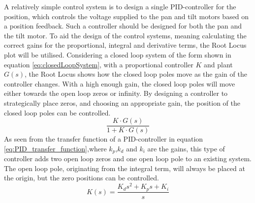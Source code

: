 \documentclass[../../main.tex]{subfiles}
\begin{document}
A relatively simple control system is to design a single PID-controller for the position, which controls the voltage supplied to the pan and tilt motors based on a position feedback. Such a controller should be designed for both the pan and the tilt motor. To aid the design of the control systems, meaning calculating the correct gains for the proportional, integral and derivative terms, the Root Locus plot will be utilised. Considering a closed loop system of the form shown in equation \ref{eq:closedLoopSystem}, with a proportional controller $K$ and plant $G(s)$, the Root Locus shows how the closed loop poles move as the gain of the controller changes. With a high enough gain, the closed loop poles will move either towards the open loop zeros or infinity. By designing a controller to strategically place zeros, and choosing an appropriate gain, the position of the closed loop poles can be controlled.
\begin{equation}\label{eq:closedLoopSystem}
    \frac{K\cdot G(s)}{1+K\cdot G(s)}
\end{equation}
As seen from the transfer function of a PID-controller in equation \ref{eq:PID_transfer_function},where $k_p$,$k_d$ and $k_i$ are the gains, this type of controller adds two open loop zeros and one open loop pole to an existing system. The open loop pole, originating from the integral term, will always be placed at the origin, but the zero positions can be controlled.
\begin{equation}\label{eq:PID_transfer_function}
    K(s) = \frac{K_d s^2 + K_p s + K_i}{s}
\end{equation}
\end{document}
